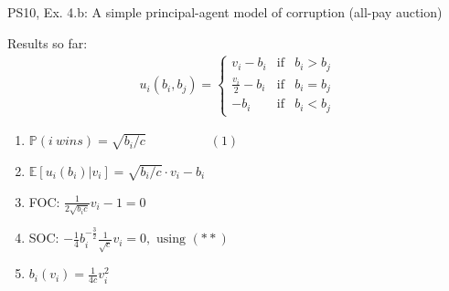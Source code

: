 \begin{frame}{PS10, Ex. 4.b: A simple principal-agent model of corruption (all-pay auction)}
\begin{multicols}{2}
\begin{itemize}
      \end{itemize}
      \vspace{-6pt}
      Results so far: \vspace{-6pt}
      \begin{align*}
        u_i(b_i,b_j)=\left\{\begin{array}{lcl}
          v_i-b_i           & \text{if} & b_i>b_j \\
          \frac{v_i}{2}-b_i & \text{if} & b_i=b_j \\
          -b_i              & \text{if} & b_i<b_j
        \end{array}\right.
      \end{align*} \vspace{-16pt}
      \begin{enumerate}
        \item $\mathbb{P}(i\ wins)=\sqrt{b_i/c}\quad\quad\quad\quad\quad(1)$
        \item $\mathbb{E}[u_i(b_i)|v_i]=\sqrt{b_i/c}\cdot v_i-b_i$
        \item FOC: $\frac{1}{2\sqrt{b_ic}}v_i-1=0$
        \item[] SOC: $-\frac{1}{4}b_i^{-\frac{3}{2}}\frac{1}{\sqrt{c}}v_i=0,\text{ using }(**)$
        \item $b_i(v_i)=\frac{1}{4c}v_i^2$
      \end{enumerate}
      \vfill\null
    \end{multicols}
\end{frame}
